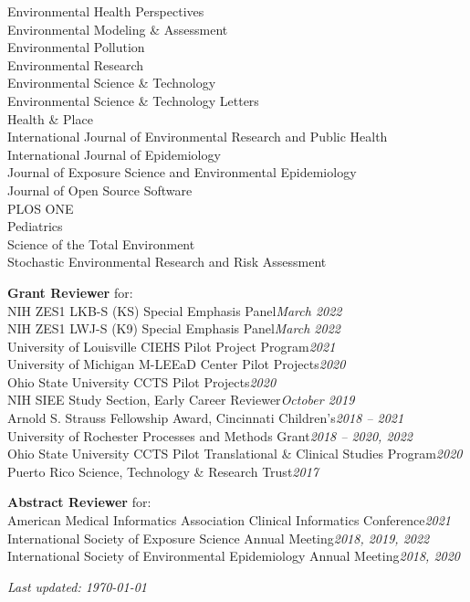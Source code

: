 \documentclass[margin,line]{res}
\newenvironment{list3}{
  \begin{list}{}{%
      \setlength{\itemsep}{0in}
      \setlength{\parsep}{0in} \setlength{\parskip}{0in}
      \setlength{\topsep}{0in} \setlength{\partopsep}{0in}
      \setlength{\leftmargin}{0in}}}{\end{list}}
\begin{document}
\begin{resume}
\begin{list3}
        Environmental Health Perspectives \\
        Environmental Modeling \& Assessment \\
        Environmental Pollution \\
        Environmental Research \\
        Environmental Science \& Technology \\
        Environmental Science \& Technology Letters\\
        Health \& Place \\
        International Journal of Environmental Research and Public Health \\
        International Journal of Epidemiology \\
        Journal of Exposure Science and Environmental Epidemiology \\
        Journal of Open Source Software \\
        PLOS ONE \\
        Pediatrics \\
        Science of the Total Environment \\
        Stochastic Environmental Research and Risk Assessment
\item[] \textbf{Grant Reviewer} for: \\
        NIH ZES1 LKB-S (KS) Special Emphasis Panel\hfill \textit{March 2022}\\
        NIH ZES1 LWJ-S (K9) Special Emphasis Panel\hfill \textit{March 2022}\\
        University of Louisville CIEHS Pilot Project Program\hfill \textit{2021}\\
        University of Michigan M-LEEaD Center Pilot Projects\hfill \textit{2020}\\
        Ohio State University CCTS Pilot Projects\hfill \textit{2020}\\
        NIH SIEE Study Section, Early Career Reviewer\hfill \textit{October 2019}\\
        Arnold S. Strauss Fellowship Award, Cincinnati Children's\hfill \textit{2018 -- 2021}\\
        University of Rochester Processes and Methods Grant\hfill \textit{2018
          -- 2020, 2022}\\
        Ohio State University CCTS Pilot Translational \& Clinical Studies
        Program\hfill \textit{2020}\\
        Puerto Rico Science, Technology \& Research Trust\hfill \textit{2017}
\item[] \textbf{Abstract Reviewer} for: \\
        American Medical Informatics Association Clinical Informatics Conference\hfill \textit{2021}\\
        International Society of Exposure Science Annual Meeting\hfill \textit{2018, 2019, 2022}\\
        International Society of Environmental Epidemiology Annual Meeting\hfill \textit{2018, 2020}
\end{list3}

\end{resume}

\vfill

\hfill \textit{Last updated: \today}
\end{document}

